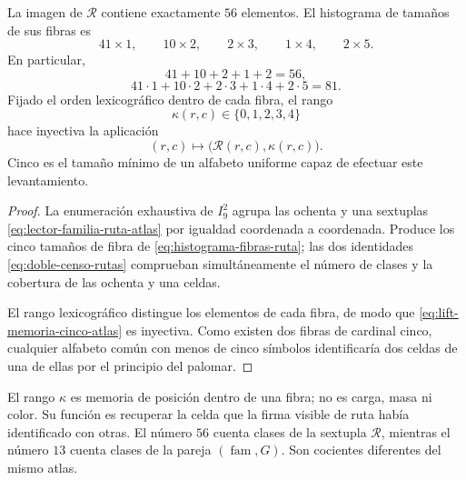 \begin{theorem}
\label{thm:censo-56-familias-ruta-rev6}
La imagen de \(\mathcal R\) contiene exactamente \(56\) elementos.  El
histograma de tamaños de sus fibras es
\[
 41\times1,\qquad
 10\times2,\qquad
 2\times3,\qquad
 1\times4,\qquad
 2\times5.
 \tag{A7}\label{eq:histograma-fibras-ruta}
\]
En particular,
\[
 41+10+2+1+2=56,
\]
\[
 41\cdot1+10\cdot2+2\cdot3+1\cdot4+2\cdot5=81.
 \tag{A8}\label{eq:doble-censo-rutas}
\]
Fijado el orden lexicográfico dentro de cada fibra, el rango
\[
 \kappa(r,c)\in\{0,1,2,3,4\}
\]
hace inyectiva la aplicación
\[
 (r,c)\longmapsto\bigl(\mathcal R(r,c),\kappa(r,c)\bigr).
 \tag{A9}\label{eq:lift-memoria-cinco-atlas}
\]
Cinco es el tamaño mínimo de un alfabeto uniforme capaz de efectuar este
levantamiento.
\end{theorem}

\begin{proof}
La enumeración exhaustiva de \(I_9^2\) agrupa las ochenta y una sextuplas
\eqref{eq:lector-familia-ruta-atlas} por igualdad coordenada a coordenada.
Produce los cinco tamaños de fibra de
\eqref{eq:histograma-fibras-ruta}; las dos identidades
\eqref{eq:doble-censo-rutas} comprueban simultáneamente el número de clases
y la cobertura de las ochenta y una celdas.

El rango lexicográfico distingue los elementos de cada fibra, de modo que
\eqref{eq:lift-memoria-cinco-atlas} es inyectiva.  Como existen dos fibras
de cardinal cinco, cualquier alfabeto común con menos de cinco símbolos
identificaría dos celdas de una de ellas por el principio del palomar.
\end{proof}

El rango \(\kappa\) es memoria de posición dentro de una fibra; no es
carga, masa ni color.  Su función es recuperar la celda que la firma visible
de ruta había identificado con otras.  El número \(56\) cuenta clases de la
sextupla \(\mathcal R\), mientras el número \(13\) cuenta clases de la pareja
\((\operatorname{fam},G)\).  Son cocientes diferentes del mismo atlas.

